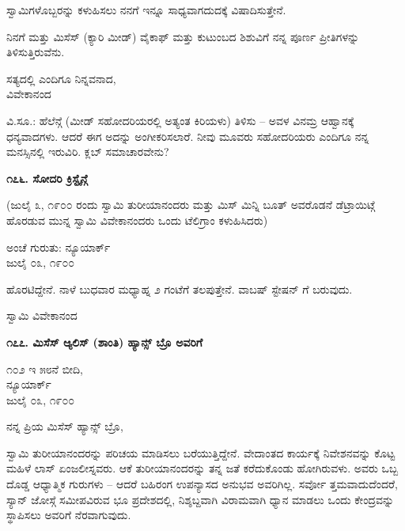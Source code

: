 ಸ್ವಾಮಿಗಳೊಬ್ಬರನ್ನು ಕಳುಹಿಸಲು ನನಗೆ ಇನ್ನೂ ಸಾಧ್ಯವಾಗದುದಕ್ಕೆ ವಿಷಾದಿಸುತ್ತೇನೆ.

ನಿನಗೆ ಮತ್ತು ಮಿಸೆಸ್ (ಕ್ಯಾರಿ ಮೀಡ್) ವೈಕಾಫ್ ಮತ್ತು ಕುಟುಂಬದ ಶಿಶುವಿಗೆ ನನ್ನ ಪೂರ್ಣ ಪ್ರೀತಿಗಳನ್ನು ತಿಳಿಸುತ್ತಿರುವೆನು.

\begin{flushright}
ಸತ್ಯದಲ್ಲಿ ಎಂದಿಗೂ ನಿನ್ನವನಾದ,\\ವಿವೇಕಾನಂದ
\end{flushright}

ವಿ.ಸೂ.: ಹೆಲೆನ್ಗೆ (ಮೀಡ್ ಸಹೋದರಿಯರಲ್ಲಿ ಅತ್ಯಂತ ಕಿರಿಯಳು) ತಿಳಿಸು – ಅವಳ ವಿನಮ್ರ ಆಹ್ವಾನಕ್ಕೆ ಧನ್ಯವಾದಗಳು. ಆದರೆ ಈಗ ಅದನ್ನು ಅಂಗೀಕರಿಸಲಾರೆ. ನೀವು ಮೂವರು ಸಹೋದರಿಯರು ಎಂದಿಗೂ ನನ್ನ ಮನಸ್ಸಿನಲ್ಲಿ ಇರುವಿರಿ. ಕ್ಲಬ್ ಸಮಾಚಾರವೇನು?

\begin{center}
\textbf{೧೭೬. ಸೋದರಿ ಕ್ರಿಸ್ಟೈನ್ಗೆ}
\end{center}

(ಜುಲೈ ೩, ೧೯೦೦ ರಂದು ಸ್ವಾಮಿ ತುರೀಯಾನಂದರು ಮತ್ತು ಮಿಸ್ ಮಿನ್ನಿ ಬೂತ್ ಅವರೊಡನೆ ಡೆಟ್ರಾಯಿಟ್ಗೆ ಹೊರಡುವ ಮುನ್ನ ಸ್ವಾಮಿ ವಿವೇಕಾನಂದರು ಒಂದು ಟೆಲಿಗ್ರಾಂ ಕಳುಹಿಸಿದರು)

\begin{flushright}
ಅಂಚೆ ಗುರುತು: ನ್ಯೂಯಾರ್ಕ್\\ಜುಲೈ ೦೩, ೧೯೦೦
\end{flushright}

ಹೊರಟಿದ್ದೇನೆ. ನಾಳೆ ಬುಧವಾರ ಮಧ್ಯಾಹ್ನ ೨ ಗಂಟೆಗೆ ತಲಪುತ್ತೇನೆ. ವಾಬಷ್ ಸ್ಟೇಷನ್ ಗೆ ಬರುವುದು.

\begin{flushright}
ಸ್ವಾಮಿ ವಿವೇಕಾನಂದ
\end{flushright}

\begin{center}
\textbf{೧೭೭. ಮಿಸೆಸ್ ಆ್ಯಲಿಸ್ (ಶಾಂತಿ) ಹ್ಯಾನ್ಸ್ ಬ್ರೊ ಅವರಿಗೆ}
\end{center}

\begin{flushright}
೧೦೨ ಇ ೫೮ನೆ ಬೀದಿ,\\ನ್ಯೂಯಾರ್ಕ್\\ಜುಲೈ ೦೩, ೧೯೦೦
\end{flushright}

ನನ್ನ ಪ್ರಿಯ ಮಿಸೆಸ್ ಹ್ಯಾನ್ಸ್ ಬ್ರೊ,

ಸ್ವಾಮಿ ತುರೀಯಾನಂದರನ್ನು ಪರಿಚಯ ಮಾಡಿಸಲು ಬರೆಯುತ್ತಿದ್ದೇನೆ. ವೇದಾಂತದ ಕಾರ್ಯಕ್ಕೆ ನಿವೇಶನವನ್ನು ಕೊಟ್ಟ ಮಹಿಳೆ ಲಾಸ್ ಏಂಜಲೀಸ್ನವರು. ಆಕೆ ತುರೀಯಾನಂದರನ್ನು ತನ್ನ ಜತೆ ಕರೆದುಕೊಂಡು ಹೋಗಿರುವಳು. ಅವರು ಒಬ್ಬ ದೊಡ್ಡ ಆಧ್ಯಾತ್ಮಿಕ ಗುರುಗಳು – ಆದರೆ ಬಹಿರಂಗ ಉಪನ್ಯಾಸದ ಅನುಭವ ಅವರಿಗಿಲ್ಲ. ಸರ್ವೋ ತ್ತಮವಾದುದೆಂದರೆ, ಸ್ಯಾನ್ ಜೋಸ್ಗೆ ಸಮೀಪವಿರುವ ಭೂ ಪ್ರದೇಶದಲ್ಲಿ, ನಿಶ್ಶಬ್ದವಾಗಿ ವಿರಾಮವಾಗಿ ಧ್ಯಾನ ಮಾಡಲು ಒಂದು ಕೇಂದ್ರವನ್ನು ಸ್ಥಾಪಿಸಲು ಅವರಿಗೆ ನೆರವಾಗುವುದು.

